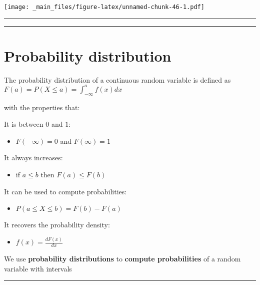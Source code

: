 \documentclass[
]{book}
\providecommand{\tightlist}{%
  \setlength{\itemsep}{0pt}\setlength{\parskip}{0pt}}
\begin{document}
\texttt{[image: \_main\_files/figure-latex/unnamed-chunk-46-1.pdf]}

\begin{center}\rule{0.5\linewidth}{0.5pt}\end{center}

\begin{center}\rule{0.5\linewidth}{0.5pt}\end{center}

\hypertarget{probability-distribution-4}{%
\section{Probability distribution}\label{probability-distribution-4}}

The probability distribution of a continuous random variable is defined as\\
\(F(a)=P(X\leq a) =\int_{-\infty} ^a f(x)dx\)

with the properties that:

It is between \(0\) and \(1\):

\begin{itemize}
\tightlist
\item
  \(F(-\infty)= 0\) and \(F(\infty)=1\)
\end{itemize}

It always increases:

\begin{itemize}
\tightlist
\item
  if \(a\leq b\) then \(F(a)\leq F(b)\)
\end{itemize}

It can be used to compute probabilities:

\begin{itemize}
\tightlist
\item
  \(P(a \leq X \leq b)=F(b)-F(a)\)
\end{itemize}

It recovers the probability density:

\begin{itemize}
\tightlist
\item
  \(f(x)=\frac{dF(x)}{dx}\)
\end{itemize}

We use \textbf{probability distributions} to \textbf{compute probabilities} of a random variable with intervals

\begin{center}\rule{0.5\linewidth}{0.5pt}\end{center}
\end{document}
